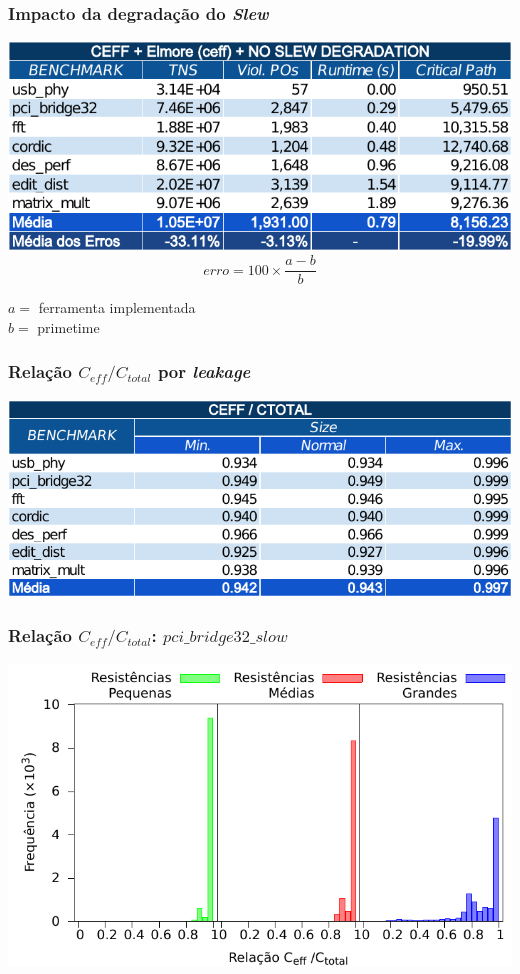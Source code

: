 \documentclass[10pt,a4paper]{beamer}
\begin{document}
		\begin{frame}
			\frametitle{Impacto da degradação do \textit{Slew}}
			\begin{center}
				\includegraphics[width=\linewidth]{img/ceff_elmore_no_slew.pdf}
				$$erro = 100 \times \frac{a - b}{ b } $$
			\end{center}
			
			$a = $ ferramenta implementada \\
			$b = $ primetime
			
		\end{frame}
		
		\begin{frame}
			\frametitle{Relação $C_{eff} / C_{total}$ por \textit{leakage}}
			\includegraphics[width=\linewidth]{img/ceff_ratio/ceff_ctotal_todos.pdf}
		\end{frame}
		
		\begin{frame}
			\frametitle{Relação $C_{eff} / C_{total}$: $pci\_bridge32\_slow$}
			\includegraphics[width=\linewidth]{img/experimentos/pci_bridge32_resistance_full.pdf} 
		\end{frame}
		
\end{document}
